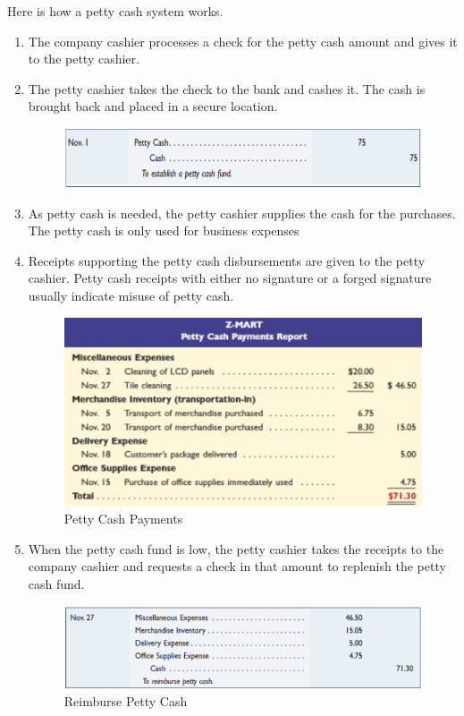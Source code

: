 \documentclass[../main.tex]{subfiles}
\begin{document}
	Here is how a petty cash system works. 
	\begin{enumerate}[noitemsep]
		\item The company cashier processes a check for the petty cash amount 
		and gives it to the petty cashier. 
		\item The petty cashier takes the check to the bank and cashes it. The 
		cash is brought back and placed in a secure location. 
		\begin{figure}[ht]
			\centering
			\includegraphics[width=1\columnwidth]{images/c5/establish_petty_cash.png}
		\end{figure}
		\item As petty cash is needed, the petty cashier supplies the cash for 
		the purchases. The petty cash is only used for business expenses
		\item Receipts supporting the petty cash disbursements are given to the 
		petty cashier. Petty cash receipts with either no signature or a forged 
		signature usually indicate misuse of petty cash.
		\begin{figure}[ht]
			\centering
			\includegraphics[width=1\columnwidth]{images/c5/payment_cash_payments.png}
			\caption{Petty Cash Payments}
		\end{figure}
		\item When the petty cash fund is low, the petty cashier takes the 
		receipts to the company cashier and requests a check in that amount to 
		replenish the petty cash fund.
		\begin{figure}[ht]
			\centering
			\includegraphics[width=1\columnwidth]{images/c5/reimburse_petty_cash.png}
			\caption{Reimburse Petty Cash}
		\end{figure}
	\end{enumerate}
	
\end{document}
